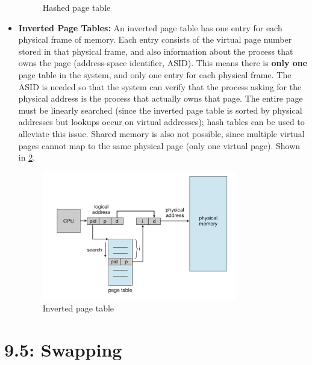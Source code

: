 \documentclass[12pt]{article}
\begin{document}
\begin{itemize}
\begin{figure}[ht]
            \caption{Hashed page table}
            \label{fig:hashed-page-table}
        \end{figure}
    \item \textbf{Inverted Page Tables:} An inverted page table has one entry for each physical frame of memory. Each entry consists of the virtual page number stored in that physical frame, and also information about the process that owns the page (address-space identifier, ASID). This means there is \textbf{only one} page table in the system, and only one entry for each physical frame. The ASID is needed so that the system can verify that the process asking for the physical address is the process that actually owns that page. The entire page must be linearly searched (since the inverted page table is sorted by physical addresses but lookups occur on virtual addresses); hash tables can be used to alleviate this issue. Shared memory is also not possible, since multiple virtual pages cannot map to the same physical page (only one virtual page). Shown in \ref{fig:inverted-page-table}.
        \begin{figure}[ht]
            \centering
            \includegraphics[width=0.8\textwidth]{figures/inverted-page-table.jpg}
            \caption{Inverted page table}
            \label{fig:inverted-page-table}
        \end{figure}
\end{itemize}

\section*{9.5: Swapping}
\end{document}
